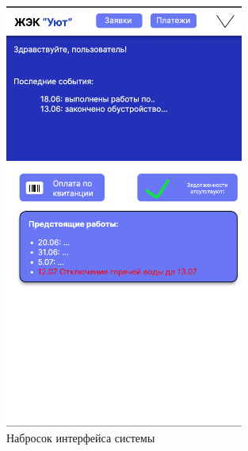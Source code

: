 \begin{figure}[h]
\centering
\includegraphics[width=0.7\textwidth]{Images/interface.png}
\caption{Набросок интерфейса системы}
\end{figure}


\s
 